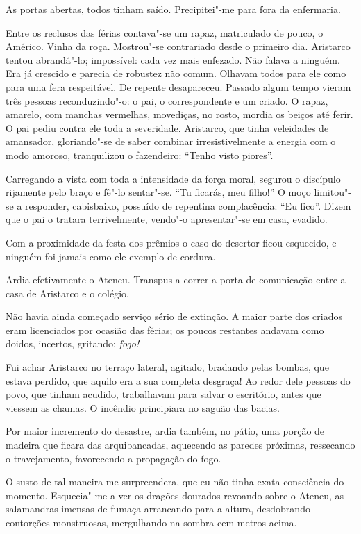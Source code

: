 As portas abertas, todos tinham saído. Precipitei"-me para
fora da enfermaria. 

Entre os reclusos das férias contava"-se um rapaz,
matriculado de pouco, o Américo. Vinha da roça. Mostrou"-se
contrariado desde o primeiro dia. Aristarco tentou abrandá"-lo;
impossível: cada vez mais enfezado. Não falava a ninguém. Era já
crescido e parecia de robustez não comum. Olhavam todos para ele como
para uma fera respeitável. De repente desapareceu. Passado algum tempo
vieram três pessoas reconduzindo"-o: o pai, o correspondente e um
criado. O rapaz, amarelo, com manchas vermelhas, movediças, no rosto,
mordia os beiços até ferir. O pai pediu contra ele toda a severidade.
Aristarco, que tinha veleidades de amansador, gloriando"-se de saber
combinar irresistivelmente a energia com o modo amoroso, tranquilizou o
fazendeiro: ``Tenho visto piores''. 

Carregando a vista com toda a
intensidade da força moral, segurou o discípulo rijamente pelo braço e
fê"-lo sentar"-se. ``Tu ficarás, meu filho!'' O moço limitou"-se a
responder, cabisbaixo, possuído de repentina complacência: ``Eu fico''.
Dizem que o pai o tratara terrivelmente, vendo"-o apresentar"-se em
casa, evadido. 

Com a proximidade da festa dos prêmios o caso do
desertor ficou esquecido, e ninguém foi jamais como ele exemplo de
cordura. 

Ardia efetivamente o Ateneu. Transpus a correr a porta de
comunicação entre a casa de Aristarco e o colégio. 

Não havia ainda
começado serviço sério de extinção. A maior parte dos criados eram
licenciados por ocasião das férias; os poucos restantes andavam como
doidos, incertos, gritando: \textit{fogo!}

Fui achar Aristarco no terraço
lateral, agitado, bradando pelas bombas, que estava perdido, que aquilo
era a sua completa desgraça! Ao redor dele pessoas do povo, que tinham
acudido, trabalhavam para salvar o escritório, antes que viessem as
chamas. O incêndio principiara no saguão das bacias. 

Por maior incremento do desastre, ardia também, 
no pátio, uma porção de madeira
que ficara das arquibancadas, aquecendo as paredes próximas, ressecando
o travejamento, favorecendo a propagação do fogo. 

O susto de tal
maneira me surpreendera, que eu não tinha exata consciência do momento.
Esquecia"-me a ver os dragões dourados revoando sobre o Ateneu, as
salamandras imensas de fumaça arrancando para a altura, desdobrando
contorções monstruosas, mergulhando na sombra cem metros acima. 

